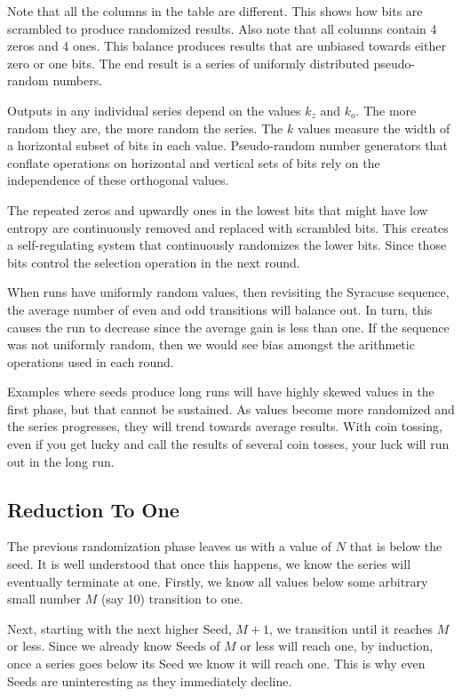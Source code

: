\documentclass[letterpaper]{article}
\begin{document}
Note that all the columns in the table are different. This shows how bits are scrambled to produce randomized results. Also note that all columns contain 4 zeros and 4 ones. This balance produces results that are unbiased towards either zero or one bits. The end result is a series of uniformly distributed pseudo-random numbers.

Outputs in any individual series depend on the values $k_z$ and $k_o$. The more random they are, the more random the series. The $k$ values measure the width of a horizontal subset of bits in each value. Pseudo-random number generators that conflate operations on horizontal and vertical sets of bits rely on the independence of these orthogonal values.

The repeated zeros and upwardly ones in the lowest bits that might have low entropy are continuously removed and replaced with scrambled bits. This creates a self-regulating system that continuously randomizes the lower bits. Since those bits control the selection operation in the next round.

When runs have uniformly random values, then revisiting the Syracuse sequence, the average number of even and odd transitions will balance out. In turn, this causes the run to decrease since the average gain is less than one. If the sequence was not uniformly random, then we would see bias amongst the arithmetic operations used in each round.

Examples where seeds produce long runs will have highly skewed values in the first phase, but that cannot be sustained. As values become more randomized and the series progresses, they will trend towards average results. With coin tossing, even if you get lucky and call the results of several coin tosses, your luck will run out in the long run.

\subsection{Reduction To One}

The previous randomization phase leaves us with a value of \( N \) that is below the seed. It is well understood that once this happens, we know the series will eventually terminate at one. Firstly, we know all values below some arbitrary small number \( M \) (say 10) transition to one.

Next, starting with the next higher Seed, \( M + 1 \), we transition until it reaches \( M \) or less. Since we already know Seeds of \( M \) or less will reach one, by induction, once a series goes below its Seed we know it will reach one. This is why even Seeds are uninteresting as they immediately decline.
\end{document}
